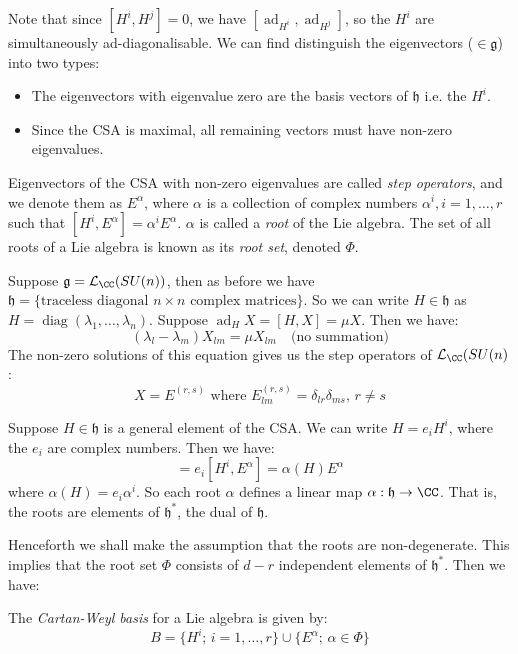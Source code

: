 \documentclass{jknotes}
\begin{document}
Note that since \([H^i,H^j]=0\), we have \([\operatorname{ad}_{H^i},\operatorname{ad}_{H^j}]\), so the \(H^i\) are simultaneously ad-diagonalisable. We can find distinguish the eigenvectors (\(\in \mathfrak{g}\)) into two types:
\begin{itemize}
    \item The eigenvectors with eigenvalue zero are the basis vectors of \(\mathfrak{h}\) i.e. the \(H^i\).
    \item Since the CSA is maximal, all remaining vectors must have non-zero eigenvalues.
\end{itemize}
\begin{defn}
    Eigenvectors of the CSA with non-zero eigenvalues are called \emph{step operators}, and we denote them as \(E^\alpha\), where \(\alpha\) is a collection of complex numbers \(\alpha^i,i=1,\dots,r\) such that \([H^i,E^\alpha] = \alpha^iE^\alpha\). \(\alpha\) is called a \emph{root} of the Lie algebra. The set of all roots of a Lie algebra is known as its \emph{root set}, denoted \(\Phi\).
\end{defn}
\begin{eg}
    Suppose \(\mathfrak{g}=\mathcal{L}_\CC(SU(n))\), then as before we have \(\mathfrak{h}=\{\text{traceless diagonal }n\times n\text{ complex matrices}\}\). So we can write \(H\in\mathfrak{h}\) as \(H = \operatorname{diag}(\lambda_1,\dots,\lambda_n)\). Suppose \(\operatorname{ad}_HX=[H,X] = \mu X\). Then we have: 
    \begin{equation}
        (\lambda_l-\lambda_m)X_{lm}=\mu X_{lm} \quad \text{(no summation)}
    \end{equation}
    The non-zero solutions of this equation gives us the step operators of \(\mathcal{L}_\CC(SU(n)\):
    \begin{equation}
        X = E^{(r,s)} \text{ where } E^{(r,s)}_{lm} = \delta_{lr}\delta_{ms}, \, r\ne s
    \end{equation}
\end{eg}
Suppose \(H\in \mathfrak{h}\) is a general element of the CSA. We can write \(H=e_iH^i\), where the \(e_i\) are complex numbers. Then we have:
\begin{equation}
    [H,E^\alpha]=e_i[H^i,E^\alpha]=\alpha(H)E^\alpha
\end{equation}
where \(\alpha(H) = e_i\alpha^i\). So each root \(\alpha\) defines a linear map \(\alpha:\mathfrak{h}\rightarrow \CC\). That is, the roots are elements of \(\mathfrak{h}^*\), the dual of \(\mathfrak{h}\).

Henceforth we shall make the assumption that the roots are non-degenerate. This implies that the root set \(\Phi\) consists of \(d-r\) independent elements of \(\mathfrak{h}^*\). Then we have:
\begin{defn}
    The \emph{Cartan-Weyl basis} for a Lie algebra is given by:
    \begin{equation}
        B = \{H^i;\,i=1,\dots,r\}\cup\{E^\alpha;\,\alpha\in\Phi\}
    \end{equation}
\end{defn}
\end{document}
